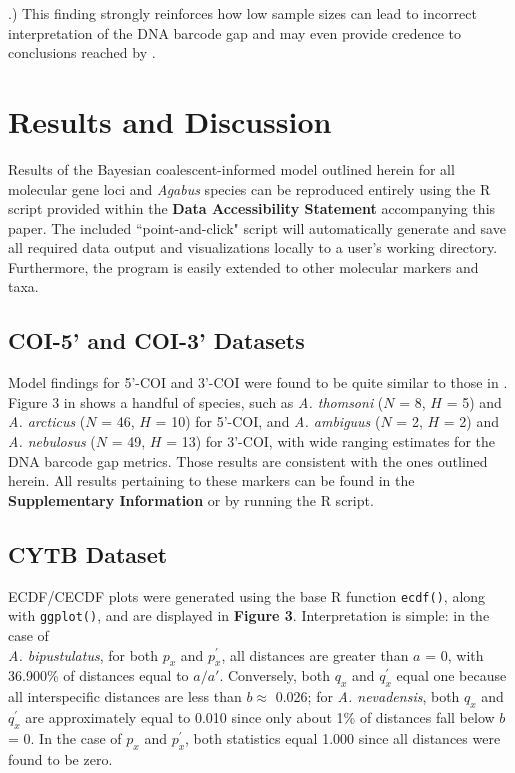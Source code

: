 \documentclass[12pt]{article}
\begin{document}
\citet{phillips2024measure}.) This finding strongly reinforces how low sample sizes can lead to incorrect interpretation of the DNA barcode gap and may even provide credence to conclusions reached by \citet{pallares2024genomic}.

\section{Results and Discussion}

Results of the Bayesian coalescent-informed model outlined herein for all molecular gene loci and \textit{Agabus} species can be reproduced entirely using the R script provided within the \textbf{Data Accessibility Statement} accompanying this paper. The included ``point-and-click" script will automatically generate and save all required data output and visualizations locally to a user's working directory. Furthermore, the program is easily extended to other molecular markers and taxa.

\subsection{COI-5' and COI-3' Datasets}

Model findings for 5'-COI and 3'-COI were found to be quite similar to those in \citet{phillips2024measure}. Figure 3 in \citet{phillips2024measure} shows a handful of species, such as \textit{A. thomsoni} ($N$ = 8, $H$ = 5) and \textit{A. arcticus} ($N$ = 46, $H$ = 10) for 5'-COI, and \textit{A. ambiguus} ($N$ = 2, $H$ = 2) and \textit{A. nebulosus} ($N$ = 49, $H$ = 13) for 3'-COI, with wide ranging estimates for the DNA barcode gap metrics. Those results are consistent with the ones outlined herein. All results pertaining to these markers can be found in the \textbf{Supplementary Information} or by running the R script.

\subsection{CYTB Dataset}

ECDF/CECDF plots were generated using the base R function {\tt ecdf()}, along with {\tt ggplot()}, and are displayed in \textbf{Figure 3}. Interpretation is simple: in the case of \\ \textit{A. bipustulatus}, for both $p_x$ and $p^{'}_x$, all distances are greater than $a$ = 0, with 36.900\% of distances equal to $a/a'$. Conversely, both $q_x$ and $q^{'}_x$ equal one because all interspecific distances are less than $b \approx$ 0.026; for \textit{A. nevadensis}, both $q_x$ and $q^{'}_x$ are approximately equal to 0.010 since only about 1\% of distances fall below $b$ = 0. In the case of $p_x$ and $p^{'}_x$, both statistics equal 1.000 since all distances were found to be zero.
\end{document}
